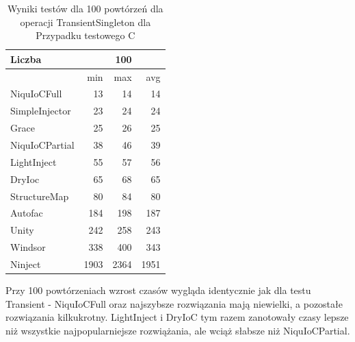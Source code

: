 \documentclass[12pt]{article}
\begin{document}
\begin{table}[H]
\captionsetup{belowskip=0pt,aboveskip=0pt}
\begin{center}
\begin{small}
	\begin{tabular}{ | l | r r r | }
    		\hline
Liczba & & 100 & \\ \hline
 & min & max & avg \\ \hline
NiquIoCFull & 13 & 14 & 14 \\ \hline
SimpleInjector & 23 & 24 & 24 \\ \hline
Grace & 25 & 26 & 25 \\ \hline
NiquIoCPartial & 38 & 46 & 39 \\ \hline
LightInject & 55 & 57 & 56 \\ \hline
DryIoc & 65 & 68 & 65 \\ \hline
StructureMap & 80 & 84 & 80 \\ \hline
Autofac & 184 & 198 & 187 \\ \hline
Unity & 242 & 258 & 243 \\ \hline
Windsor & 338 & 400 & 343 \\ \hline
Ninject & 1903 & 2364 & 1951 \\ \hline
  	\end{tabular}
\end{small}
\end{center}
\caption{Wyniki testów dla 100 powtórzeń dla operacji TransientSingleton dla Przypadku testowego C}
\label{TestCaseC_TransientSingleton100}
\end{table}
Przy 100 powtórzeniach wzrost czasów wygląda identycznie jak dla testu Transient - NiquIoCFull oraz najszybsze rozwiązania mają niewielki, a pozostałe rozwiązania kilkukrotny. LightInject i DryIoC tym razem zanotowały czasy lepsze niż wszystkie najpopularniejsze rozwiążania, ale wciąż słabsze niż NiquIoCPartial.
\\ \\
\end{document}

